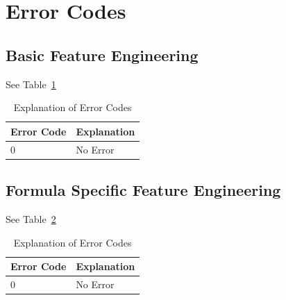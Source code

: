 \documentclass[letterpaper,12pt]{article}
\begin{document}
\section{Error Codes}

\subsection{Basic Feature Engineering}
See Table~\ref{explanation_plp1_errs}
\begin{table}
  \centering
  \begin{tabular}{|l|l|} \hline \hline
    {\bf Error Code} & {\bf Explanation} \\ \hline 
    0 & No Error \\ \hline 
    \hline
  \end{tabular}
  \label{explanation_plp1_errs}
  \caption{Explanation of Error Codes}
\end{table}

\subsection{Formula Specific Feature Engineering}

See Table~\ref{explanation_plp2_errs}
\begin{table}
  \centering
  \begin{tabular}{|l|l|} \hline \hline
    {\bf Error Code} & {\bf Explanation} \\ \hline 
    0 & No Error \\ \hline 
    \hline
  \end{tabular}
  \label{explanation_plp2_errs}
  \caption{Explanation of Error Codes}
\end{table}
\end{document}
